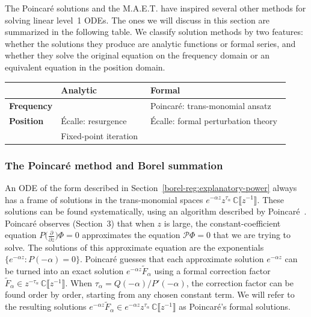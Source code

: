 \documentclass{article}
\newcommand{\C}{\mathbb{C}}
\newcommand{\series}[1]{\tilde{#1}}
\theoremstyle{definition}
\theoremstyle{plain}
\newenvironment{verify}{\color{ForestGreen}}{\color{black}}
\begin{document}
The Poincar\'{e} solutions and the M.A.E.T. have inspired several other methods for solving linear level~1 ODEs. The ones we will discuss in this section are summarized in the following table. We classify solution methods by two features: whether the solutions they produce are analytic functions or formal series, and whether they solve the original equation on the frequency domain or an equivalent equation in the position domain.
\begin{center}
\begin{tabular}{l|l|l}
& \textbf{Analytic} & \textbf{Formal} \\ \hline
\textbf{Frequency} &  & Poincar\'{e}: trans-monomial ansatz~\cite{int-irreg} \\ \hline
\textbf{Position} & \'{E}calle: resurgence  & \'{E}calle: formal perturbation theory~\cite{EcalleIII,loday-Remy2011} \\
& Fixed-point iteration~\cite{reg-sing-volterra} \\
\end{tabular}
\end{center}

\subsubsection{The Poincar\'e method and Borel summation}\label{sec:Poincare method}
An ODE of the form described in Section~\ref{borel-reg:explanatory-power} always has a frame of solutions in the trans-monomial spaces $e^{-\alpha z} z^{\tau_\alpha}\,\C\llbracket z^{-1} \rrbracket$. These solutions can be found systematically, using an algorithm described by Poincar\'{e}~\cite{int-irreg}\cite[Proposition~2.2.7, p.~111]{EcalleIII}. Poincar\'{e} observes \begin{verify}(Section~3)\end{verify} that when $z$ is large, the constant-coefficient equation $P\big(\tfrac{\partial}{\partial z}\big) \Phi = 0$ approximates the equation $\mathcal{P}\Phi = 0$ that we are trying to solve. The solutions of this approximate equation are the exponentials $\{e^{-\alpha z} \colon P(-\alpha) = 0\}$. Poincar\'{e} guesses that each approximate solution $e^{-\alpha z}$ can be turned into an exact solution $e^{-\alpha z} \series{F}_\alpha$ using a formal correction factor $\series{F}_\alpha \in z^{-\tau_\alpha}\,\C\llbracket z^{-1} \rrbracket$. When $\tau_\alpha = Q(-\alpha) / P'(-\alpha)$, the correction factor can be found order by order, starting from any chosen constant term. We will refer to the resulting solutions $e^{-\alpha z} \series{F}_\alpha \in e^{-\alpha z} z^{\tau_\alpha}\,\C\llbracket z^{-1} \rrbracket$ as Poincar\'{e}'s formal solutions.
\end{document}
